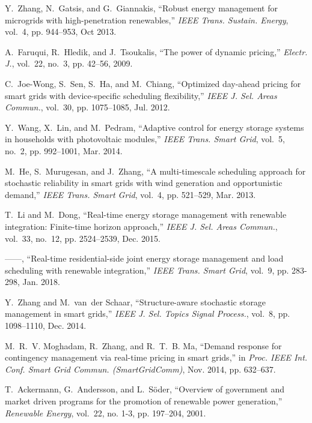 \documentclass[journal]{IEEEtran}
\begin{document}
\begin{thebibliography}{10}
Y.~Zhang, N.~Gatsis, and G.~Giannakis, ``Robust energy management for
  microgrids with high-penetration renewables,'' \emph{IEEE Trans. Sustain.
  Energy}, vol.~4, pp. 944--953, Oct 2013.

A.~Faruqui, R.~Hledik, and J.~Tsoukalis, ``The power of dynamic pricing,''
  \emph{Electr. J.}, vol.~22, no.~3, pp. 42--56, 2009.

C.~Joe-Wong, S.~Sen, S.~Ha, and M.~Chiang, ``Optimized day-ahead pricing for
  smart grids with device-specific scheduling flexibility,'' \emph{{IEEE} J.
  Sel. Areas Commun.}, vol.~30, pp. 1075--1085, Jul. 2012.

Y.~Wang, X.~Lin, and M.~Pedram, ``Adaptive control for energy storage systems
  in households with photovoltaic modules,'' \emph{{IEEE} Trans. Smart Grid},
  vol.~5, no.~2, pp. 992--1001, Mar. 2014.

M.~He, S.~Murugesan, and J.~Zhang, ``A multi-timescale scheduling approach for
  stochastic reliability in smart grids with wind generation and opportunistic
  demand,'' \emph{{IEEE} Trans. Smart Grid}, vol.~4, pp. 521--529, Mar. 2013.

T.~Li and M.~Dong, ``Real-time energy storage management with renewable
  integration: Finite-time horizon approach,'' \emph{{IEEE} J. Sel. Areas
  Commun.}, vol.~33, no.~12, pp. 2524--2539, Dec. 2015.

------, ``Real-time residential-side joint energy storage management and load scheduling with renewable integration,'' \emph{{IEEE} Trans. Smart Grid},
vol.~9, pp. 283-298, Jan. 2018.

Y.~Zhang and M.~van~der Schaar, ``Structure-aware stochastic storage management
  in smart grids,'' \emph{{IEEE} J. Sel. Topics Signal Process.}, vol.~8, pp.
  1098--1110, Dec. 2014.

M.~R.~V. Moghadam, R.~Zhang, and R.~T.~B. Ma, ``Demand response for contingency
  management via real-time pricing in smart grids,'' in \emph{Proc. {IEEE} Int.
  Conf. Smart Grid Commun. (SmartGridComm)}, Nov. 2014, pp. 632--637.

T.~Ackermann, G.~Andersson, and L.~S{\"o}der, ``Overview of government and
  market driven programs for the promotion of renewable power generation,''
  \emph{Renewable Energy}, vol.~22, no. 1-3, pp. 197--204, 2001.


\end{thebibliography}
\end{document}
